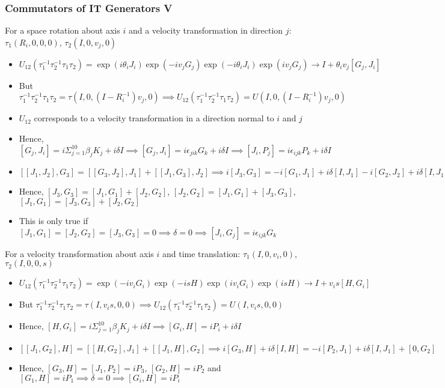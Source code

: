 \documentclass[8pt,t,mathserif,aspectratio=169]{beamer}
\begin{document}
\begin{frame}
  \frametitle{Commutators of IT Generators V}
  \vspace{1mm}
    For a space rotation about axis $i$ and a velocity transformation in direction $j$: $\tau_1(R_i,0,0,0)$, $\tau_2(I,0,v_j,0)$
  \begin{itemize}
    \item $U_{12}(\tau^{-1}_1 \tau^{-1}_2 \tau_1 \tau_2) = \exp(i \theta_i J_i) \exp(-i v_j G_j) \exp(-i \theta_i J_i) \exp(i v_j G_j) \to I + \theta_i v_j [G_j,J_i]$
    \item But $\tau^{-1}_1 \tau^{-1}_2 \tau_1 \tau_2 = \tau(I,0,(I - R^{-1}_i)v_j,0) \implies U_{12}(\tau^{-1}_1 \tau^{-1}_2 \tau_1 \tau_2) = U(I,0,(I - R^{-1}_i)v_j,0)$
    \item $U_{12}$ corresponds to a velocity transformation in a direction normal to $i$ and $j$ 
    \item Hence, $[G_j,J_i] = i \Sigma_{j = 1}^{10} \beta_j K_j + i \delta I \implies [G_j,J_i] = i \epsilon_{jik} G_k + i \delta I  \implies [J_i,P_j] = i \epsilon_{ijk} P_k + i \delta I$
    \item $[[J_1,J_2],G_3] = [[G_3,J_2],J_1] + [[J_1,G_3],J_2] \implies i[J_3,G_3] = -i[G_1,J_1] + i \delta [I,J_1] - i[G_2,J_2] + i \delta [I,J_1]$
    \item Hence, $[J_3,G_3] = [J_1,G_1] + [J_2,G_2]$, $[J_2,G_2] = [J_1,G_1] + [J_3,G_3]$, $[J_1,G_1] = [J_3,G_3] + [J_2,G_2]$
    \item This is only true if $[J_1,G_1] = [J_2,G_2] = [J_3,G_3] = 0 \implies \delta = 0 \implies [J_i,G_j] = i \epsilon_{ijk} G_k$
  \end{itemize}
  For a velocity transformation about axis $i$ and time translation: $\tau_1(I,0,v_i,0)$, $\tau_2(I,0,0,s)$
  \begin{itemize}
    \item $U_{12}(\tau^{-1}_1 \tau^{-1}_2 \tau_1 \tau_2) = \exp(-i v_i G_i) \exp(-i s H) \exp(i v_i G_i) \exp(i s H) \to I + v_i s [H,G_i]$
    \item But $\tau^{-1}_1 \tau^{-1}_2 \tau_1 \tau_2 = \tau(I,v_i s,0,0) \implies U_{12}(\tau^{-1}_1 \tau^{-1}_2 \tau_1 \tau_2) = U(I,v_i s,0,0)$
    \item Hence, $[H,G_i] = i \Sigma_{j = 1}^{10} \beta_j K_j + i \delta I \implies [G_i,H] = i P_i + i \delta I$
    \item $[[J_1,G_2],H] = [[H,G_2],J_1] + [[J_1,H],G_2] \implies i[G_3,H] + i \delta [I,H] = -i[P_2,J_1] + i \delta [I,J_1] + [0,G_2]$
    \item Hence, $[G_3,H] = [J_1,P_2] = i P_3$, $[G_2,H] = i P_2$ and $[G_1,H] = i P_1 \implies \delta = 0 \implies [G_i,H] = i P_i$
  \end{itemize}
\end{frame}
\end{document}
